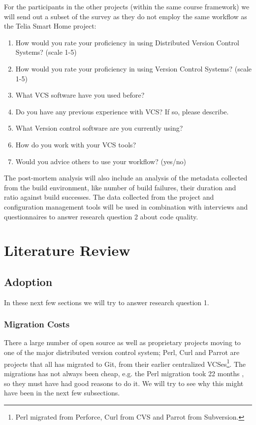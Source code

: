\documentclass{llncs}
\begin{document}
For the participants in the other projects (within the same course
framework) we will send out a subset of the survey as they do not
employ the same workflow as the Telia Smart Home project:

\begin{enumerate}
 \item How would you rate your proficiency in using Distributed
       Version Control Systems? (scale 1-5)
 \item How would you rate your proficiency in using Version Control
       Systems? (scale 1-5)
 \item What VCS software have you used before?
 \item Do you have any previous experience with VCS? If so, please
       describe.
 \item What Version control software are you currently using?
 \item How do you work with your VCS tools?
 \item Would you advice others to use your workflow? (yes/no)
\end{enumerate}

The post-mortem analysis will also include an analysis of the metadata
collected from the build environment, like number of build failures,
their duration and ratio against build successes. The data collected
from the project and configuration management tools will be used in
combination with interviews and questionnaires to answer research
question 2 about code quality.


\section{Literature Review}
\label{sec:litrev}

\subsection{Adoption}

In these next few sections we will try to answer research question 1.

\subsubsection{Migration Costs}

There a large number of open source as well as proprietary projects
moving to one of the major distributed version control system; Perl,
Curl and Parrot are projects that all has migrated to Git, from their
earlier centralized VCSes\footnote{
 Perl migrated from Perforce, Curl from CVS and Parrot from Subversion.
}. The migrations has not always been cheap, e.g. the Perl migration 
took 22 months \cite{alwis09}, so they must have had good reasons to 
do it. We will try to see why this might have been in the next few
subsections.
\end{document}
